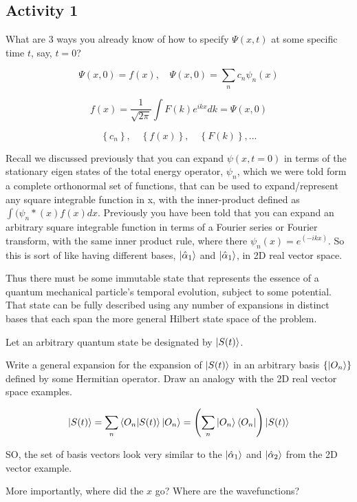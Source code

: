\documentclass{article}
\begin{document}
\subsection{Activity 1}

What are 3 ways you already know of how to specify $\Psi(x,t)$ at some specific time $t$, say, $t = 0$?

$$\Psi(x,0) = f(x), \quad \Psi(x,0) = \sum_n c_n \psi_n(x)$$

$$f(x) = \frac{1}{\sqrt{2 \pi}} \int F(k) e^{ikx} dk = \Psi(x,0)$$

$$\left\{ c_n \right\}, \quad \left\{ f(x) \right\}, \quad \left\{ F(k) \right\}, ...$$


Recall we discussed previously that you can expand $\psi(x,t=0)$ in terms of the stationary eigen states of the total energy operator, $\psi_n$, which we were told form a complete orthonormal set of functions, that can be used to expand/represent any square integrable function in x, with the inner-product defined as $\int (\psi_n*(x) f(x) dx$.   Previously you have been told that you can expand an arbitrary square integrable function in terms of a Fourier series or Fourier transform, with the same inner product rule, where there $\psi_n(x)=e^(-ikx)$.  So this is sort of like having different bases, $\ket{\hat{\alpha}_1}$  and $\ket{\hat{\alpha}_1}$, in 2D real vector space. 

\hfill

Thus there must be some immutable state that represents the essence of a quantum mechanical particle’s temporal evolution, subject to some potential.  That state can be fully described using any number of expansions in distinct bases that each span the more general Hilbert state space of the problem. 

Let an arbitrary quantum state be designated by $\ket{S(t)}$. 

Write a general expansion for the expansion of $\ket{S(t)}$ in an arbitrary basis $\left\{ \ket{O_n} \right\}$ defined by some Hermitian operator. Draw an analogy with the 2D real vector space examples. 

$$\ket{S(t)} = \sum_n \braket{O_n | S(t)} \ket{O_n} = \left( \sum_n \ket{O_n} \bra{O_n} \right) \ket{S(t)}$$

SO, the set of basis vectors look very similar to the $\ket{\hat{\alpha}_1}$ and $\ket{\hat{\alpha}_2}$ from the 2D vector example. 

More importantly, where did the $x$ go? Where are the wavefunctions?
\end{document}
